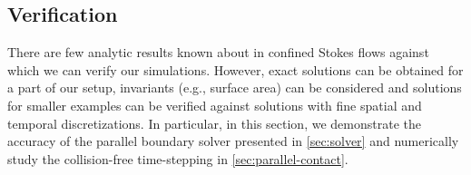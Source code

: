 \subsection{Verification}
There are few analytic results known about \rbcs in confined Stokes
flows against which we can verify our simulations. However,
exact solutions can be obtained for a part of our setup, invariants
(e.g., surface area) can be considered and solutions for smaller examples can
be verified against solutions with fine spatial and temporal discretizations.
In particular, in this section, we demonstrate the accuracy of the parallel boundary
solver presented in \cref{sec:solver} and numerically study the collision-free
time-stepping in \cref{sec:parallel-contact}. 

